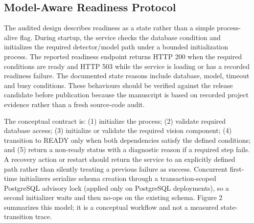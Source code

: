 \documentclass[11pt,a4paper]{article}
\begin{document}
\subsection{Model-Aware Readiness Protocol}

The audited design describes readiness as a state rather than a simple process-alive flag. During startup, the service checks the database condition and initializes the required detector/model path under a bounded initialization process. The reported readiness endpoint returns HTTP 200 when the required conditions are ready and HTTP 503 while the service is loading or has a recorded readiness failure. The documented state reasons include database, model, timeout and busy conditions. These behaviours should be verified against the release candidate before publication because the manuscript is based on recorded project evidence rather than a fresh source-code audit.

The conceptual contract is: (1) initialize the process; (2) validate required database access; (3) initialize or validate the required vision component; (4) transition to READY only when both dependencies satisfy the defined conditions; and (5) return a non-ready status with a diagnostic reason if a required step fails. A recovery action or restart should return the service to an explicitly defined path rather than silently treating a previous failure as success. Concurrent first-time initializers serialize schema creation through a transaction-scoped PostgreSQL advisory lock (applied only on PostgreSQL deployments), so a second initializer waits and then no-ops on the existing schema. Figure 2 summarizes this model; it is a conceptual workflow and not a measured state-transition trace.
\end{document}
